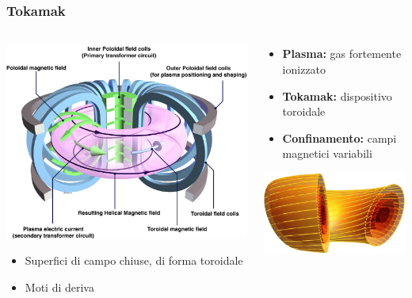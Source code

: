 \begin{frame}
\frametitle{Tokamak}
\framesubtitle{}
\begin{columns}
	\begin{column}{0.4\textwidth}
		\begin{center}
		\includegraphics[scale=0.1]{Immagini/tokamak.png}
		\end{center}
		\begin{itemize}
			\item Superfici di campo chiuse, di forma toroidale
			\item Moti di deriva
		\end{itemize}
	\end{column}
	\begin{column}{0.4\textwidth}
		\begin{itemize}
			\item {\bf Plasma:} gas fortemente ionizzato
			\item {\bf Tokamak:} dispositivo toroidale
			\item {\bf Confinamento:} campi magnetici variabili
		\end{itemize}
		\begin{center}
		\includegraphics[scale=0.15]{Immagini/superfici.png}
		\end{center}
	\end{column}
\end{columns}
\end{frame}

